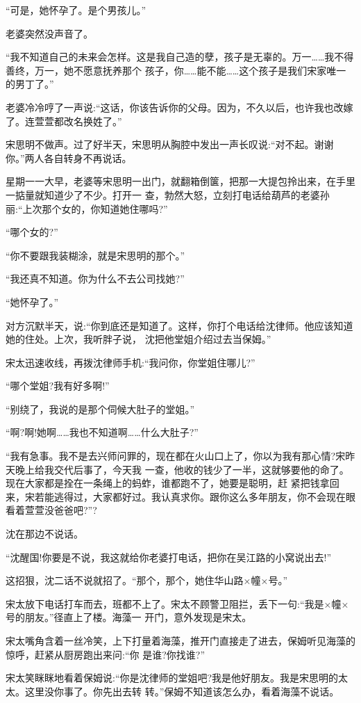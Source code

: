 \documentclass[11pt,a4paper,onecolumn]{article}
\begin{document}
``可是，她怀孕了。是个男孩儿。''

老婆突然没声音了。

``我不知道自己的未来会怎样。这是我自己造的孽，孩子是无辜的。万一……我不得善终，万一，她不愿意抚养那个
孩子，你……能不能……这个孩子是我们宋家唯一的男丁了。''

老婆冷冷哼了一声说:``这话，你该告诉你的父母。因为，不久以后，也许我也改嫁了。连萱萱都改名换姓了。''

宋思明不做声。过了好半天，宋思明从胸腔中发出一声长叹说:``对不起。谢谢你。''两人各自转身不再说话。

星期一一大早，老婆等宋思明一出门，就翻箱倒箧，把那一大提包拎出来，在手里一掂量就知道少了不少。打开一
查，勃然大怒，立刻打电话给葫芦的老婆孙丽:``上次那个女的，你知道她住哪吗?''

``哪个女的?''

``你不要跟我装糊涂，就是宋思明的那个。''

``我还真不知道。你为什么不去公司找她?''

``她怀孕了。''

对方沉默半天，说:``你到底还是知道了。这样，你打个电话给沈律师。他应该知道她的住处。上次，我听胖子说，
沈把他堂姐介绍过去当保姆。''

宋太迅速收线，再拨沈律师手机:``我问你，你堂姐住哪儿?''

``哪个堂姐?我有好多啊!''

``别绕了，我说的是那个伺候大肚子的堂姐。''

``啊?啊!她啊……我也不知道啊……什么大肚子?''

``我有急事。我不是去兴师问罪的，现在都在火山口上了，你以为我有那心情?宋昨天晚上给我交代后事了，今天我
一查，他收的钱少了一半，这就够要他的命了。现在大家都是拴在一条绳上的蚂蚱，谁都跑不了，她要是聪明，赶
紧把钱拿回来，宋若能逃得过，大家都好过。我认真求你。跟你这么多年朋友，你不会现在眼看着萱萱没爸爸吧?''?

沈在那边不说话。

``沈醒国!你要是不说，我这就给你老婆打电话，把你在吴江路的小窝说出去!''

这招狠，沈二话不说就招了。``那个，那个，她住华山路×幢×号。''

宋太放下电话打车而去，班都不上了。宋太不顾警卫阻拦，丢下一句:``我是×幢×号的朋友。''径直上了楼。海藻一
开门，意外发现是宋太。

宋太嘴角含着一丝冷笑，上下打量着海藻，推开门直接走了进去，保姆听见海藻的惊呼，赶紧从厨房跑出来问:``你
是谁?你找谁?''

宋太笑眯眯地看着保姆说:``你是沈律师的堂姐吧?我是他好朋友。我是宋思明的太太。这里没你事了。你先出去转
转。''保姆不知道该怎么办，看着海藻不说话。
\end{document}
